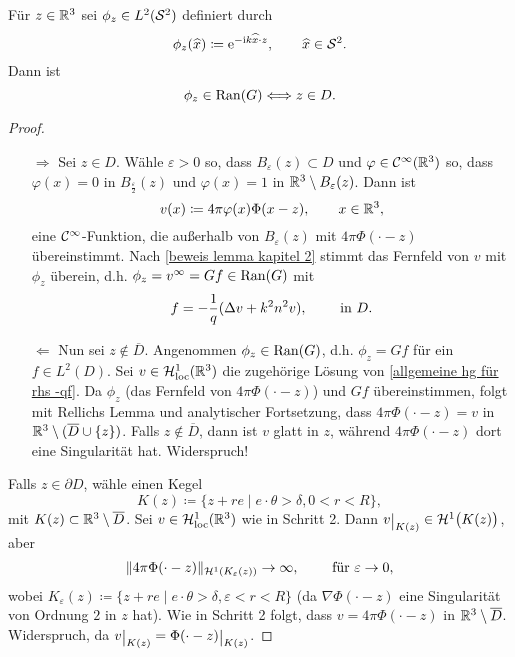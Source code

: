 \begin{satz}\label{satz: charakterisierung phi_z vzgl ran(G) bzw z in D}
	Für \(z\in\mathbb{R}^3\) sei \(\phi_z\in L^2(\mathcal{S}^2)\) definiert durch
	\begin{equation*}
		\phi_z(\widehat{x})\coloneqq\mathrm{e}^{-\mathrm{i} k \widehat{x}\cdot z},\qquad\widehat{x}\in\mathcal{S}^2.
	\end{equation*}
	Dann ist
	\begin{equation*}
		\phi_z\in\operatorname{Ran}(G)\Longleftrightarrow z\in D.
	\end{equation*}
\end{satz}
\begin{proof}\
	\begin{enumerate}
		\item[\glqq{}\(\Rightarrow\)\grqq{}]
			Sei \(z\in D\). Wähle \(\varepsilon>0\) so, dass \(B_\varepsilon(z)\subset D\) und \(\varphi\in\mathcal{C}^\infty(\mathbb{R}^3)\) so, dass \(\varphi(x)=0\) in \(B_{\frac{\varepsilon}{2}}(z)\) und \(\varphi(x)=1\) in \(\mathbb{R}^3\setminus B_\varepsilon(z)\). Dann ist
			\begin{equation*}
				v(x)\coloneqq4\pi\varphi(x)\Phi(x-z),\qquad x\in\mathbb{R}^3,
			\end{equation*}
			eine \(\mathcal{C}^\infty\)-Funktion, die außerhalb von \(B_\varepsilon(z)\) mit \(4\pi\Phi(\cdot -z)\) übereinstimmt. Nach \eqref{beweis lemma kapitel 2} stimmt das Fernfeld von \(v\) mit \(\phi_z\) überein, d.h. \(\phi_z=v^\infty=Gf\in\operatorname{Ran}(G)\) mit
			\begin{equation*}
				f=-\frac{1}{q}(\Delta v+k^2n^2v),\qquad\text{ in }D.
			\end{equation*}
		\item[\glqq{}\(\Leftarrow\)\grqq{}]
			Nun sei \(z\notin\overline{D}\). Angenommen \(\phi_z\in\operatorname{Ran}(G)\), d.h. \(\phi_z=Gf\) für ein \(f\in L^2(D)\). Sei \(v\in\mathcal{H}_{\mathrm{loc}}^1(\mathbb{R}^3)\) die zugehörige Lösung von \eqref{allgemeine hg für rhs -qf}. Da \(\phi_z\) (das Fernfeld von \(4\pi\Phi(\cdot-z)\)) und \(Gf\) übereinstimmen, folgt mit Rellichs Lemma und analytischer Fortsetzung, dass \(4\pi\Phi(\cdot-z)=v\) in \(\mathbb{R}^3\setminus(\overline{D}\cup\{z\})\). Falls \(z\notin\overline{D}\), dann ist \(v\) glatt in \(z\), während \(4\pi\Phi(\cdot-z)\) dort eine Singularität hat. Widerspruch!
	\end{enumerate}
	Falls \(z\in\partial D\), wähle einen Kegel
	\begin{equation*}
		K(z)\coloneqq\{z+re\mid e\cdot\theta>\delta,0<r<R\},
	\end{equation*}
	mit \(K(z)\subset\mathbb{R}^3\setminus\overline{D}\). Sei \(v\in\mathcal{H}_{\mathrm{loc}}^1(\mathbb{R}^3)\) wie in Schritt 2. Dann \(v\restrict{K(z)}\in\H^1\big(K(z)\big)\), aber
	\begin{equation*}
		\|4\pi\Phi(\cdot-z)\|_{\mathcal{H}^1(K_\varepsilon(z))}\to\infty,\qquad\text{ für }\varepsilon\to0,
	\end{equation*}
	wobei \(K_\varepsilon(z)\coloneqq\{z+re\mid e\cdot\theta>\delta,\varepsilon<r<R\}\) (da \(\nabla\Phi(\cdot-z)\) eine Singularität von Ordnung \(2\) in \(z\) hat). Wie in Schritt 2 folgt, dass \(v=4\pi\Phi(\cdot-z)\) in \(\mathbb{R}^3\setminus\overline{D}\). Widerspruch, da \(v\restrict{K(z)}=\Phi(\cdot-z)\restrict{K(z)}\).
\end{proof}
